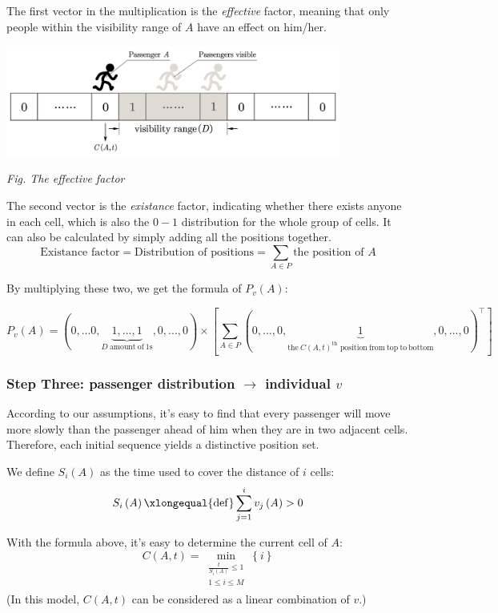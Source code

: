 \documentclass{article}
\theoremstyle{definition}
\theoremstyle{remark}
\numberwithin{equation}{section}
\begin{document}
	The first vector in the multiplication is the \textit{effective} factor, meaning that only people within the visibility range of \(A\) have an effect on him/her.

	\begin{center}
	\includegraphics[width = 11cm]{effective factor.jpg}

	\small\textit{Fig. The effective factor}
	\end{center}

	The second vector is the \textit{existance} factor, indicating whether there exists anyone in each cell, which is also the \(0-1\) distribution for the whole group of cells. It can also be calculated by simply adding all the positions together.
	\[\text{Existance factor} = \text{Distribution of positions} = \sum\limits_{A\in P} \text{the position of }A\]

	By multiplying these two, we get the formula of \(P_v\left( A \right)\):

	$$P_v\left( A \right) =\left( 0,...0,\underset{D\:\mathrm{amount}\:\mathrm{of}\:1\mathrm{s}}{\underbrace{1,...,1}},0,...,0 \right) \times \left[ \sum_{A\in P}{\left( 0,...,0,\underset{\mathrm{the}\:C\left( A,t \right) ^{\mathrm{th}}\,\,\mathrm{position}\:\mathrm{from}\:\mathrm{top}\:\mathrm{to}\:\mathrm{bottom}}{\underbrace{1}},0,...,0 \right) ^{\top}} \right] $$
	\subsubsection{Step Three: passenger distribution \(\to \) individual \(v\)}
	According to our assumptions, it's easy to find that every passenger will move more slowly than the passenger ahead of him when they are in two adjacent cells. Therefore, each initial sequence yields a distinctive position set.

	We define \(S_i\left( A \right)\) as the time used to cover the distance of \(i\) cells:
	$$S_i\left( A \right) \xlongequal{\mathrm{def}}\sum_{j=1}^i{v_j\left( A \right)}>0$$

	With the formula above, it's easy to determine the current cell of \(A\):
	$$C\left( A,t \right) =\min_{\substack{\frac{t}{S_i\left( A \right)}\le 1\\1\le i\le M\\}} \left\{ i \right\} $$
	(In this model, $C(A,t)$ can be considered as a linear combination of $v$.)
\end{document}
